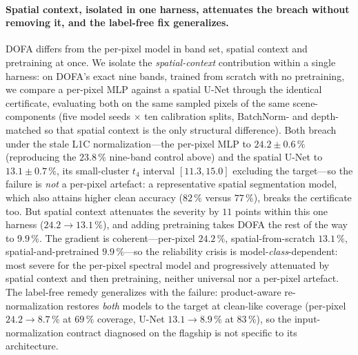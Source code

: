 \documentclass[preprint,3p,times]{elsarticle}
\begin{document}
\paragraph{Spatial context, isolated in one harness, attenuates the breach without removing it, and the label-free fix generalizes.} DOFA differs from the per-pixel model in band set, spatial context and pretraining at once. We isolate the \emph{spatial-context} contribution within a single harness: on DOFA's exact nine bands, trained from scratch with no pretraining, we compare a per-pixel MLP against a spatial U-Net through the identical certificate, evaluating both on the same sampled pixels of the same scene-components (five model seeds $\times$ ten calibration splits, BatchNorm- and depth-matched so that spatial context is the only structural difference). Both breach under the stale L1C normalization---the per-pixel MLP to $24.2 \pm 0.6\,\%$ (reproducing the $23.8\,\%$ nine-band control above) and the spatial U-Net to $13.1 \pm 0.7\,\%$, its small-cluster $t_4$ interval $[11.3, 15.0]$ excluding the target---so the failure is \emph{not} a per-pixel artefact: a representative spatial segmentation model, which also attains higher clean accuracy ($82\,\%$ versus $77\,\%$), breaks the certificate too. But spatial context attenuates the severity by $11$ points within this one harness ($24.2 \to 13.1\,\%$), and adding pretraining takes DOFA the rest of the way to $9.9\,\%$. The gradient is coherent---per-pixel $24.2\,\%$, spatial-from-scratch $13.1\,\%$, spatial-and-pretrained $9.9\,\%$---so the reliability crisis is model-\emph{class}-dependent: most severe for the per-pixel spectral model and progressively attenuated by spatial context and then pretraining, neither universal nor a per-pixel artefact. The label-free remedy generalizes with the failure: product-aware re-normalization restores \emph{both} models to the target at clean-like coverage (per-pixel $24.2 \to 8.7\,\%$ at $69\,\%$ coverage, U-Net $13.1 \to 8.9\,\%$ at $83\,\%$), so the input-normalization contract diagnosed on the flagship is not specific to its architecture.
\end{document}

